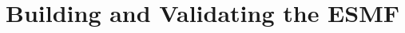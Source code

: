
\setlength{\parskip}{1.5ex}
\setlength{\parindent}{0em}

\section{Building and Validating the ESMF}
\label{sec:TechOver}







